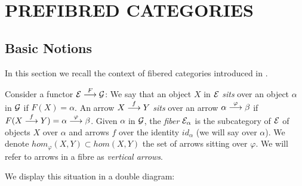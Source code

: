


\section{PREFIBRED CATEGORIES} \label{fibrations}
\subsection{Basic Notions}


In this section we recall the context of fibered categories introduced in \cite{sga1}.

Consider a functor $\mathcal{E} \overset {F} {\longrightarrow} \mathcal{G}$: We say that an object $X$ in $\mathcal{E}$ \emph{sits} over an object $\alpha$ in $\mathcal{G}$ if $F(X) = \alpha$. An arrow $X \overset {f} {\longrightarrow} Y$   \emph{sits} over an arrow    
$\alpha \overset {\varphi} {\longrightarrow} \beta$ if 
$F(X \overset {f} {\longrightarrow} Y) = \alpha \overset {\varphi} {\longrightarrow} \beta$. Given $\alpha$ in $\mathcal{G}$, the \emph{fiber} $\mathcal{E}_\alpha$ is the subcategory of $\mathcal{E}$ of objects $X$ over $\alpha$ and arrows $f$ over the identity $id_\alpha$ (we will say over 
$\alpha$). We denote  
$hom_{\varphi}(X,Y) \subset hom(X,Y)$ the set of arrows sitting over $\varphi$.
We will refer to arrows in a fibre as \emph{vertical arrows}.

We display this situation in a double diagram:

